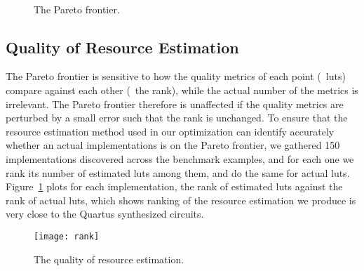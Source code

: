 \begin{figure}[ht]
    \centering
     \\
    \caption{The Pareto frontier.}
\end{figure}

\subsection{Quality of Resource Estimation}

The Pareto frontier is sensitive to how the quality metrics of each point
(\eg~\glspl{lut}) compare against each other (\ie~the rank), while the actual
number of the metrics is irrelevant.  The Pareto frontier therefore is
unaffected if the quality metrics are perturbed by a small error such that
the rank is unchanged.  To ensure that the resource estimation method used in
our optimization can identify accurately whether an actual implementations
is on the Pareto frontier, we gathered 150 implementations discovered
across the benchmark examples, and for each one we rank its number of
estimated \glspl{lut} among them, and do the same for actual \glspl{lut}.
Figure~\ref{po:fig:rank} plots for each implementation, the rank of estimated
\glspl{lut} against the rank of actual \glspl{lut}, which shows ranking of
the resource estimation we produce is very close to the Quartus synthesized
circuits.
\begin{figure}[ht]
    \centering
    \texttt{[image: rank]}
    \caption{%
        The quality of resource estimation.
    }\label{po:fig:rank}
\end{figure}

